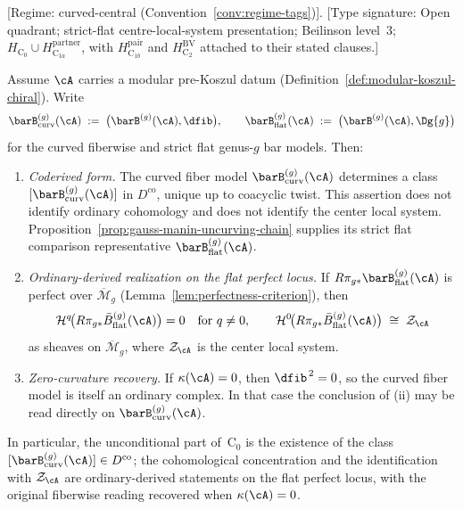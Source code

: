 \begin{theorem}
\label{thm:fiber-center-identification}
\textup{[}Regime: curved-central
\textup{(}Convention~\textup{\ref{conv:regime-tags})].}
\textup{[}Type signature: Open quadrant; strict-flat
centre-local-system presentation; Beilinson level~3;
\(H_{\mathrm C_0}\cup H_{\mathrm C_{1a}}^{\mathrm{partner}}\),
with \(H_{\mathrm C_{1b}}^{\mathrm{pair}}\) and
\(H_{\mathrm C_2}^{\mathrm{BV}}\) attached to their stated clauses.\textup{]}

\smallskip\noindent
Assume $\cA$ carries a modular pre-Koszul datum
\textup{(}Definition~\textup{\ref{def:modular-koszul-chiral})}.
Write
\[
\barB^{(g)}_{\mathrm{curv}}(\cA)
\;:=\;
\bigl(\barB^{(g)}(\cA), \dfib\bigr),
\qquad
\barB^{(g)}_{\mathrm{flat}}(\cA)
\;:=\;
\bigl(\barB^{(g)}(\cA), \Dg{g}\bigr)
\]
for the curved fiberwise and strict flat genus-$g$ bar models.
Then:
\begin{enumerate}[label=\textup{(\roman*)}]
\item \emph{Coderived form.}\;
 The curved fiber model
 $\barB^{(g)}_{\mathrm{curv}}(\cA)$ determines a class
 $[\barB^{(g)}_{\mathrm{curv}}(\cA)]$ in $D^{\mathrm{co}}$, unique
 up to coacyclic twist. This assertion does not identify ordinary
 cohomology and does not identify the center local system.
 Proposition~\textup{\ref{prop:gauss-manin-uncurving-chain}}
 supplies its strict flat comparison representative
 $\barB^{(g)}_{\mathrm{flat}}(\cA)$.

\item \emph{Ordinary-derived realization on the flat perfect locus.}\;
 If $R\pi_{g*}\barB^{(g)}_{\mathrm{flat}}(\cA)$ is perfect over
 $\overline{\mathcal{M}}_g$
 \textup{(}Lemma~\textup{\ref{lem:perfectness-criterion})},
 then
 \begin{equation}\label{eq:fiber-center}
 \mathcal{H}^q\!\bigl(
 R\pi_{g*}\bar{B}^{(g)}_{\mathrm{flat}}(\cA)\bigr) = 0
 \quad\text{for } q \neq 0,
 \qquad
 \mathcal{H}^0\!\bigl(
 R\pi_{g*}\bar{B}^{(g)}_{\mathrm{flat}}(\cA)\bigr)
 \;\cong\; \mathcal{Z}_{\cA}
 \end{equation}
 as sheaves on $\overline{\mathcal{M}}_g$, where
 $\mathcal{Z}_{\cA}$ is the center local system.

\item \emph{Zero-curvature recovery.}\;
 If $\kappa(\cA)=0$, then $\dfib^{\,2}=0$, so the curved fiber model
 is itself an ordinary complex. In that case the conclusion of
 \textup{(ii)} may be read directly on
 $\barB^{(g)}_{\mathrm{curv}}(\cA)$.
\end{enumerate}
In particular, the unconditional part of~$\mathrm{C}_0$ is the
existence of the class
$[\barB^{(g)}_{\mathrm{curv}}(\cA)]\in D^{\mathrm{co}}$; the
cohomological concentration and the identification with
$\mathcal Z_{\cA}$ are ordinary-derived statements on the flat
perfect locus, with the original fiberwise reading recovered when
$\kappa(\cA)=0$.
\end{theorem}

